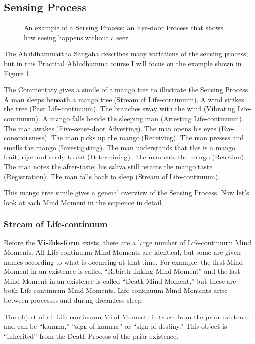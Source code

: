 \subsection*{Sensing Process}

\begin{figure}[H]
\centering

\caption{An example of a Sensing Process; an Eye-door Process that shows how seeing happens without a seer.}
\label{fig:Process}
\end{figure}


The Abhidhammattha Sangaha describes many variations of the sensing process, but in this Practical Abhidhamma course I will focus on the example shown in Figure \ref{fig:Process}.

The Commentary gives a simile of a mango tree to illustrate the Sensing Process. A man sleeps beneath a mango tree (Stream of Life-continuum). A wind strikes the tree (Past Life-continuum). The branches sway with the wind (Vibrating Life-continuum). A mango falls beside the sleeping man (Arresting Life-continuum). The man awakes (Five-sense-door Adverting). The man opens his eyes (Eye-consciousness). The man picks up the mango (Receiving). The man presses and smells the mango (Investigating). The man understands that this is a mango fruit, ripe and ready to eat (Determining). The man eats the mango (Reaction). The man notes the after-taste; his saliva still retains the mango taste (Registration). The man falls back to sleep (Stream of Life-continuum).

This mango tree simile gives a general overview of the Sensing Process. Now let’s look at each Mind Moment in the sequence in detail.

\subsubsection*{Stream of Life-continuum}

Before the \textbf{Visible-form} exists, there are a large number of Life-continuum Mind Moments. All Life-continuum Mind Moments are identical, but some are given names according to what is occurring at that time. For example, the first Mind Moment in an existence is called “Rebirth-linking Mind Moment” and the last Mind Moment in an existence is called “Death Mind Moment,” but these are both Life-continuum Mind Moments. Life-continuum Mind Moments arise between processes and during dreamless sleep.

The object of all Life-continuum Mind Moments is taken from the prior existence and can be “kamma,” “sign of kamma” or “sign of destiny.” This object is “inherited” from the Death Process of the prior existence. 

